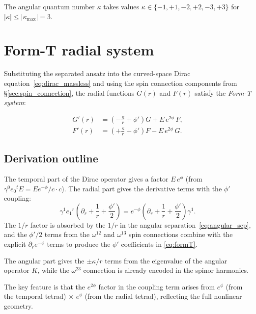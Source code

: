 \documentclass[11pt,letterpaper]{article}
\numberwithin{equation}{section}
\begin{document}
The angular quantum number $\kappa$ takes values $\kappa \in \{-1,+1,-2,+2,-3,+3\}$
for $|\kappa| \leq |\kappa_\mathrm{max}| = 3$.

\section{Form-T radial system}
\label{sec:formT}

Substituting the separated ansatz into the curved-space Dirac
equation~\eqref{eq:dirac_massless} and using the spin connection
components from \S\ref{sec:spin_connection}, the radial functions
$G(r)$ and $F(r)$ satisfy the \emph{Form-T system}:

\begin{equation}
\label{eq:formT}
\boxed{
\begin{aligned}
  G'(r) &= \left(-\frac{\kappa}{r} + \phi'\right)G + E\,e^{2\phi}\,F, \\[4pt]
  F'(r) &= \left(+\frac{\kappa}{r} + \phi'\right)F - E\,e^{2\phi}\,G.
\end{aligned}
}
\end{equation}

\subsection{Derivation outline}

The temporal part of the Dirac operator gives a factor $E\,e^{\phi}$ (from
$\gamma^0 e_0{}^t E = E e^{+\phi}/c \cdot c$). The radial part gives the
derivative terms with the $\phi'$ coupling:
\begin{equation}
  \gamma^1 e_1{}^r\!\left(\partial_r + \frac{1}{r} + \frac{\phi'}{2}\right)
  = e^{-\phi}\!\left(\partial_r + \frac{1}{r} + \frac{\phi'}{2}\right)\gamma^1.
\end{equation}
The $1/r$ factor is absorbed by the $1/r$ in the angular
separation~\eqref{eq:angular_sep}, and the $\phi'/2$ terms from the
$\omega^{12}$ and $\omega^{13}$ spin connections combine with the explicit
$\partial_r e^{-\phi}$ terms to produce the $\phi'$ coefficients in
\eqref{eq:formT}.

The angular part gives the $\pm\kappa/r$ terms from the eigenvalue of
the angular operator $K$, while the $\omega^{23}$ connection is already
encoded in the spinor harmonics.

The key feature is that the $e^{2\phi}$ factor in the coupling term arises
from $e^{\phi}$ (from the temporal tetrad) $\times$ $e^{\phi}$ (from the
radial tetrad), reflecting the full nonlinear geometry.
\end{document}
